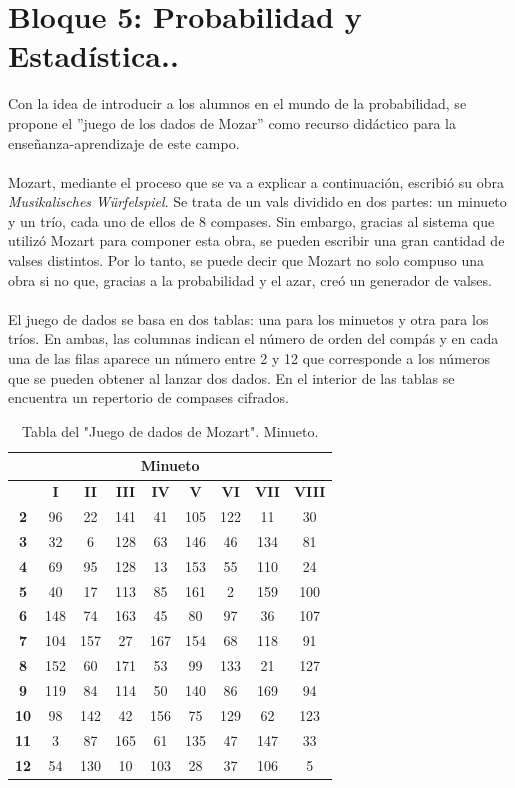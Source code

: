 \documentclass[a4paper, openright, 11pt, titlepage]{report}
\theoremstyle{definition}\newtheorem{defin}[propo]{Definition}
\theoremstyle{definition}\newtheorem{obser}[propo]{Remark}
\theoremstyle{definition}\newtheorem{ejem}[propo]{Ejemplo}
\theoremstyle{definition}\newtheorem{algoritmo}[propo]{Algoritmo}
\begin{document}
\section{Bloque 5: Probabilidad y Estadística..}
Con la idea de introducir a los alumnos en el mundo de la probabilidad, se propone el ''juego de los dados de Mozar'' como recurso didáctico para la enseñanza-aprendizaje de este campo.\\\\
Mozart, mediante el proceso que se va a explicar a continuación, escribió su obra \textit{Musikalisches Würfelspiel}. Se trata de un vals dividido en dos partes: un minueto y un trío, cada uno de ellos de 8 compases. Sin embargo, gracias al sistema que utilizó Mozart para componer esta obra, se pueden escribir una gran cantidad de valses distintos. Por lo tanto, se puede decir que Mozart no solo compuso una obra si no que, gracias a la probabilidad y el azar, creó un generador de valses.\\\\
El juego de dados se basa en dos tablas: una para los minuetos y otra para los tríos. En ambas, las columnas indican el número de orden del compás y en cada una
de las filas aparece un número entre 2 y 12 que corresponde a los números que se pueden obtener al lanzar dos dados.
En el interior de las tablas se encuentra un repertorio de compases cifrados.
\begin{table}[H]
    \centering
    \begin{tabular}{|c|c|c|c|c|c|c|c|c|}
    \hline
    \multicolumn{9}{|c|}{Minueto}\\
    \hline \hline 
         & \textbf{I} & \textbf{II} & \textbf{III} & \textbf{IV} & \textbf{V} & \textbf{VI} & \textbf{VII} & \textbf{VIII}\\
         \hline
         \textbf{2} & 96 & 22 & 141 & 41 & 105 & 122 & 11 & 30\\
         \hline
         \textbf{3} & 32 & 6 & 128 & 63 & 146 & 46 & 134 & 81\\
         \hline
         \textbf{4} & 69 & 95 & 128 & 13 & 153 & 55 & 110 & 24\\
         \hline
         \textbf{5} & 40 & 17 & 113 & 85 & 161 & 2 & 159 & 100\\
         \hline
         \textbf{6} & 148 & 74 & 163 & 45 & 80 & 97 & 36 & 107\\
         \hline
         \textbf{7} & 104 & 157 & 27 & 167 & 154 & 68 & 118 & 91\\
         \hline
         \textbf{8} & 152 & 60 & 171 & 53 & 99 & 133 & 21 & 127\\
         \hline
         \textbf{9} & 119 & 84 & 114 & 50 & 140 & 86 & 169 & 94\\
         \hline
         \textbf{10} & 98 & 142 & 42 & 156 & 75 & 129 & 62 & 123\\
         \hline
         \textbf{11} & 3 & 87 & 165 & 61 & 135 & 47 & 147 & 33\\
         \hline
         \textbf{12} & 54 & 130 & 10 & 103 & 28 & 37 & 106 & 5\\
         \hline
    \end{tabular}
    \caption{Tabla del "Juego de dados de Mozart". Minueto.}
\end{table}
\end{document}
